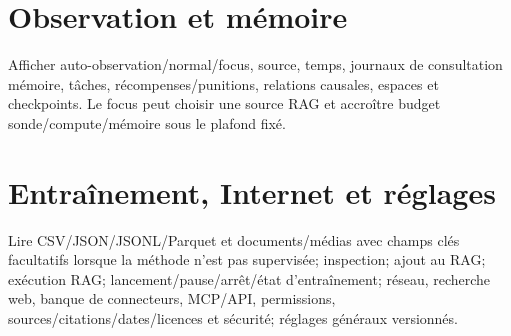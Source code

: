 \documentclass[11pt,a4paper]{report}
\begin{document}
\section{Observation et mémoire}Afficher auto-observation/normal/focus, source, temps, journaux de consultation mémoire, tâches, récompenses/punitions, relations causales, espaces et checkpoints. Le focus peut choisir une source RAG et accroître budget sonde/compute/mémoire sous le plafond fixé.
\section{Entraînement, Internet et réglages}Lire CSV/JSON/JSONL/Parquet et documents/médias avec champs clés facultatifs lorsque la méthode n'est pas supervisée; inspection; ajout au RAG; exécution RAG; lancement/pause/arrêt/état d'entraînement; réseau, recherche web, banque de connecteurs, MCP/API, permissions, sources/citations/dates/licences et sécurité; réglages généraux versionnés.
\end{document}
